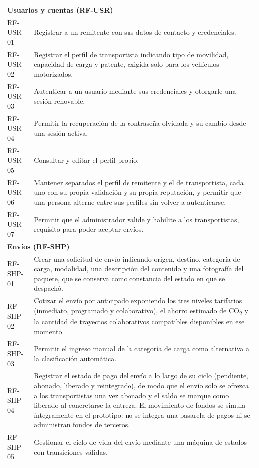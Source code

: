 {\begin{longtable}{p{2.4cm}p{11.2cm}}
    \multicolumn{2}{l}{\textbf{Usuarios y cuentas (RF-USR)}} \\
    RF-USR-01 & Registrar a un remitente con sus datos de contacto y credenciales. \\
    RF-USR-02 & Registrar el perfil de transportista indicando tipo de movilidad, capacidad de carga y patente, exigida solo para los vehículos motorizados. \\
    RF-USR-03 & Autenticar a un usuario mediante sus credenciales y otorgarle una sesión renovable. \\
    RF-USR-04 & Permitir la recuperación de la contraseña olvidada y su cambio desde una sesión activa. \\
    RF-USR-05 & Consultar y editar el perfil propio. \\
    RF-USR-06 & Mantener separados el perfil de remitente y el de transportista, cada uno con su propia validación y su propia reputación, y permitir que una persona alterne entre sus perfiles sin volver a autenticarse. \\
    RF-USR-07 & Permitir que el administrador valide y habilite a los transportistas, requisito para poder aceptar envíos. \\
    \midrule
    \multicolumn{2}{l}{\textbf{Envíos (RF-SHP)}} \\
    RF-SHP-01 & Crear una solicitud de envío indicando origen, destino, categoría de carga, modalidad, una descripción del contenido y una fotografía del paquete, que se conserva como constancia del estado en que se despachó. \\
    RF-SHP-02 & Cotizar el envío por anticipado exponiendo los tres niveles tarifarios (inmediato, programado y colaborativo), el ahorro estimado de CO\textsubscript{2} y la cantidad de trayectos colaborativos compatibles disponibles en ese momento. \\
    RF-SHP-03 & Permitir el ingreso manual de la categoría de carga como alternativa a la clasificación automática. \\
    RF-SHP-04 & Registrar el estado de pago del envío a lo largo de su ciclo (pendiente, abonado, liberado y reintegrado), de modo que el envío solo se ofrezca a los transportistas una vez abonado y el saldo se marque como liberado al concretarse la entrega. El movimiento de fondos se simula íntegramente en el prototipo: no se integra una pasarela de pagos ni se administran fondos de terceros. \\
    RF-SHP-05 & Gestionar el ciclo de vida del envío mediante una máquina de estados con transiciones válidas. \\

\end{longtable}}
